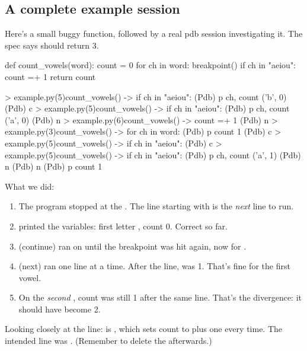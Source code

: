 \documentclass[10pt,a4paper]{article}
\begin{document}
\subsection{A complete example session}
Here’s a small buggy function, followed by a real pdb session investigating it. The spec says  should return 3.
\begin{pycode}
def count_vowels(word):
    count = 0
    for ch in word:
        breakpoint()
        if ch in "aeiou":
            count =+ 1
    return count
\end{pycode}
\begin{txtcode}
> example.py(5)count_vowels()
-> if ch in "aeiou":
(Pdb) p ch, count
('b', 0)
(Pdb) c
> example.py(5)count_vowels()
-> if ch in "aeiou":
(Pdb) p ch, count
('a', 0)
(Pdb) n
> example.py(6)count_vowels()
-> count =+ 1
(Pdb) n
> example.py(3)count_vowels()
-> for ch in word:
(Pdb) p count
1
(Pdb) c
> example.py(5)count_vowels()
-> if ch in "aeiou":
(Pdb) c
> example.py(5)count_vowels()
-> if ch in "aeiou":
(Pdb) p ch, count
('a', 1)
(Pdb) n
(Pdb) n
(Pdb) p count
1
\end{txtcode}
What we did:
\begin{enumerate}
\item The program stopped at the . The line starting with \code{-\textgreater{}\allowbreak{}} is the \emph{next} line to run.
\item {} printed the variables: first letter , count 0. Correct so far.
\item {} (continue) ran on until the breakpoint was hit again, now for .
\item {} (next) ran one line at a time. After the  line,  was 1. That’s fine for the first vowel.
\item On the \emph{second} , count was still 1 after the same line. That’s the divergence: it should have become 2.
\end{enumerate}
Looking closely at the line:  is , which sets count to plus one every time. The intended line was . (Remember to delete the  afterwards.)
\end{document}
